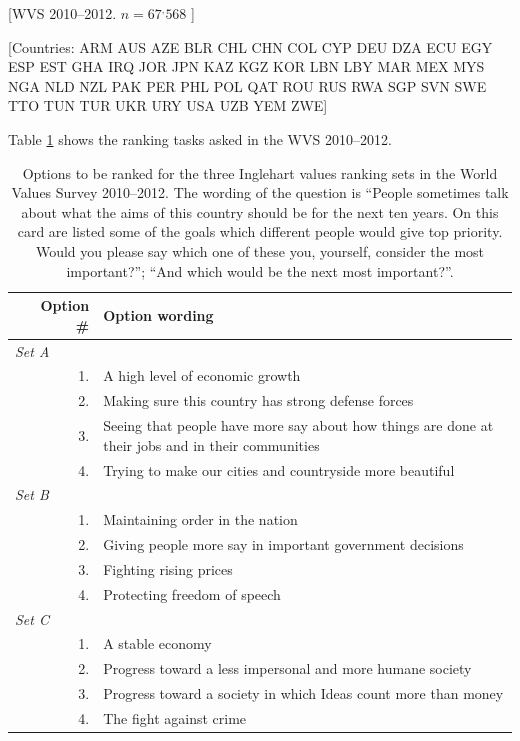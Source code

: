 \documentclass[letterpaper,12pt]{article}
\begin{document}
[WVS 2010--2012. $n=67^,568$ ]

[Countries: ARM AUS AZE BLR CHL CHN COL CYP DEU DZA ECU EGY ESP EST GHA IRQ JOR JPN KAZ KGZ KOR LBN LBY MAR MEX MYS NGA NLD NZL PAK PER PHL POL QAT ROU RUS RWA SGP SVN SWE TTO TUN TUR UKR URY USA UZB YEM ZWE]

Table \ref{tab:ranking-question} shows the ranking tasks asked in the WVS 2010--2012.

\begin{table}
\begin{tabular}{p{}rp{}}
\hline
& Option \# & Option wording\\
\hline
\multicolumn{3}{l}{\emph{Set A}}\\
&1. & A high level of economic growth\\
&2. & Making sure this country has strong defense forces \\
&3. & Seeing that people have more say about how things are done at their jobs and in their communities\\
&4. & Trying to make our cities and countryside more beautiful\\

\multicolumn{3}{l}{\emph{Set B}}\\
&1. & 	Maintaining order in the nation\\
&2. & Giving people more say in important government decisions \\
&3. & 	Fighting rising prices\\
&4. & Protecting freedom of speech\\

\multicolumn{3}{l}{\emph{Set C}}\\
&1. & 	A stable economy\\
&2. & Progress toward a less impersonal and more humane society \\
&3. & 	Progress toward a society in which Ideas count more than money \\
&4. & 	The fight against crime\\
\hline
	\end{tabular}
\caption{\label{tab:ranking-question}
Options to be ranked for the three Inglehart values ranking sets in 
the World Values Survey 2010--2012. The wording of the question is
``People sometimes talk about what the aims of this country should be for the next ten years. On this card are listed some of the goals which different people would give top priority. Would you please say which one of these you, yourself, consider the most important?''; ``And which would be the next most important?''.
}
\end{table}
\end{document}
